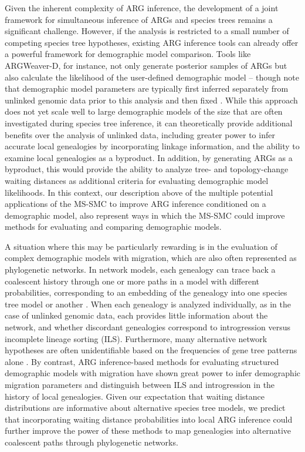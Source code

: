 \documentclass[11pt]{article}
\begin{document}
Given the inherent complexity of ARG inference, the development 
of a joint framework for simultaneous inference of ARGs and species 
trees remains a significant challenge. 
However, if the analysis is restricted to a small number of 
competing species tree hypotheses, existing ARG inference tools
can already offer a powerful framework for demographic model 
comparison.
% 
Tools like ARGWeaver-D, for instance, not only generate posterior
samples of ARGs but also calculate the likelihood of the 
user-defined demographic model -- though note that demographic model
parameters are typically first inferred separately from unlinked
genomic data prior to this analysis and then fixed
\citep{hubisz2020inference}.
% 
While this approach does not yet scale well to large demographic
models of the size that are often investigated during species
tree inference, it can theoretically provide additional benefits
over the analysis of unlinked data, including greater power to 
infer accurate local genealogies by incorporating linkage information,
and the ability to examine local genealogies as a byproduct.
% 
In addition, by generating ARGs as a byproduct, this would 
provide the ability to analyze tree- and topology-change waiting 
distances as additional criteria for evaluating demographic 
model likelihoods. 
% 
In this context, our description above of the multiple potential
applications of the MS-SMC to improve ARG inference conditioned 
on a demographic model, also represent ways in which the MS-SMC
could improve methods for evaluating and comparing demographic models.


A situation where this may be particularly rewarding is in 
the evaluation of complex demographic models with migration, 
which are also often represented as phylogenetic networks.
% 
In network models, each genealogy can trace back a coalescent 
history through one or more paths in a model with different 
probabilities, corresponding to an embedding of the genealogy 
into one species tree model or another
\citep{wen_bayesian_2016, degnan2018modeling}. %
% 
When each genealogy is analyzed individually, as in the case of 
unlinked genomic data, each provides little information about the
network, and whether discordant genealogies correspond to 
introgression versus incomplete lineage sorting (ILS).
% 
Furthermore, many alternative network hypotheses are often 
unidentifiable based on the frequencies of gene tree patterns
alone \citep{solis-lemus_inferring_2016}.
% 
By contrast, ARG inference-based methods for evaluating 
structured demographic models with migration 
\citep{hubisz2020inference, guo_recombination-aware_2022}
have shown great power to infer demographic migration parameters
and distinguish between ILS and introgression in the history of
local genealogies.
% 
Given our expectation that waiting distance distributions are 
informative about alternative species tree models, we predict
that incorporating waiting distance probabilities into local ARG 
inference could further improve the power of these methods to map
genealogies into alternative coalescent paths through phylogenetic
networks.
\end{document}
